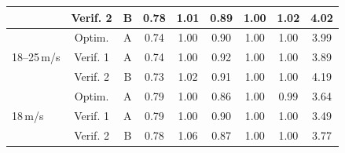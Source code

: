 \begin{table}[h]
\begin{tabular}{@{}l*{8}{c}@{}}
         & Verif. 2 & B & 0.78 & 1.01 & 0.89 & 1.00 & 1.02 & 4.02 \\
        \midrule
        \multirow{3}{*}{18--25\,m/s} & Optim. & A & 0.74 & 1.00 & 0.90 & 1.00 & 1.00 & 3.99 \\
         & Verif. 1 & A & 0.74 & 1.00 & 0.92 & 1.00 & 1.00 & 3.89 \\
         & Verif. 2 & B & 0.73 & 1.02 & 0.91 & 1.00 & 1.00 & 4.19 \\
        \midrule
        \multirow{3}{*}{18\,m/s} & Optim. & A & 0.79 & 1.00 & 0.86 & 1.00 & 0.99 & 3.64 \\
         & Verif. 1 & A & 0.79 & 1.00 & 0.90 & 1.00 & 1.00 & 3.49 \\
         & Verif. 2 & B & 0.78 & 1.06 & 0.87 & 1.00 & 1.00 & 3.77 \\
        \bottomrule
    \end{tabular}
    \label{tabone}
\end{table}
